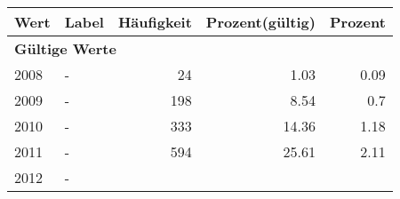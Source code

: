      \begin{longtable}{lXrrr}
     \toprule
     \textbf{Wert} & \textbf{Label} & \textbf{Häufigkeit} & \textbf{Prozent(gültig)} & \textbf{Prozent} \\
     \endhead
     \midrule
     \multicolumn{5}{l}{\textbf{Gültige Werte}}\\

     2008 &
     \multicolumn{1}{X}{ -  } &


       \num{24} &
       \num[round-mode=places,round-precision=2]{1.03} &
         \num[round-mode=places,round-precision=2]{0.09} \\

     2009 &
     \multicolumn{1}{X}{ -  } &


       \num{198} &
       \num[round-mode=places,round-precision=2]{8.54} &
         \num[round-mode=places,round-precision=2]{0.7} \\

     2010 &
     \multicolumn{1}{X}{ -  } &


       \num{333} &
       \num[round-mode=places,round-precision=2]{14.36} &
         \num[round-mode=places,round-precision=2]{1.18} \\

     2011 &
     \multicolumn{1}{X}{ -  } &


       \num{594} &
       \num[round-mode=places,round-precision=2]{25.61} &
         \num[round-mode=places,round-precision=2]{2.11} \\

     2012 &
     \multicolumn{1}{X}{ -  } &



\end{longtable}
